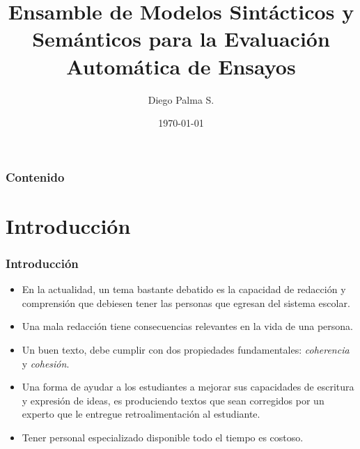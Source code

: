 \documentclass{beamer}
\title[Propuesta de Tesis De Magíster]{Ensamble de Modelos Sintácticos y Semánticos para la Evaluación Automática de Ensayos} %
\author{Diego Palma S.} %
\institute[UDEC] %
{
Profesor Supervisor: John Atkinson \\
\medskip
Universidad de Concepción \\ %
\medskip
\textit{dipalma@udec.cl} %
}
\date{\today} %
\begin{document}
\begin{frame}
\titlepage %
\end{frame}

\begin{frame}
\frametitle{Contenido} %
\tableofcontents %
\end{frame}


\section{Introducción} %

\begin{frame}
\frametitle{Introducción}
\begin{itemize}
\item En la actualidad, un tema bastante debatido es la capacidad de redacción y comprensión que debiesen tener las personas que egresan del sistema escolar.
\item Una mala redacción tiene consecuencias relevantes en la vida de una persona.
\item Un buen texto, debe cumplir con dos propiedades fundamentales: {\em coherencia} y {\em cohesión}.
\item Una forma de ayudar a los estudiantes a mejorar sus capacidades de escritura y expresión de ideas, es produciendo textos que sean corregidos por un experto que le entregue retroalimentación al estudiante.
\item Tener personal especializado disponible todo el tiempo es costoso.
\end{itemize}
\end{frame}
\end{document}
